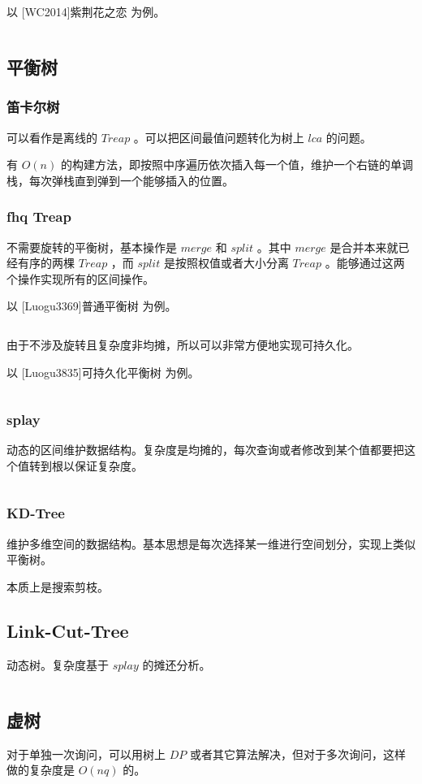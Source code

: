 \documentclass[UTF-8]{ctexart}
\newcommand{\cpp}[1]{\inputminted[bgcolor=bg,breaklines,breakanywhere=true]{c++}{#1}}
\begin{document}
				以 [WC2014]紫荆花之恋 为例。
				\cpp{code//Example/UOJ55.cpp}
		\subsection{平衡树}
			\subsubsection{笛卡尔树}
			可以看作是离线的 $Treap$ 。可以把区间最值问题转化为树上 $lca$ 的问题。
	
			有 $O(n)$ 的构建方法，即按照中序遍历依次插入每一个值，维护一个右链的单调栈，每次弹栈直到弹到一个能够插入的位置。
			\subsubsection{fhq Treap}
			不需要旋转的平衡树，基本操作是 $merge$ 和 $split$ 。其中 $merge$ 是合并本来就已经有序的两棵 $Treap$ ，而 $split$ 是按照权值或者大小分离 $Treap$ 。能够通过这两个操作实现所有的区间操作。
			
			以 [Luogu3369]普通平衡树 为例。
			\cpp{code/Example/Luogu3369.cpp}
	
			由于不涉及旋转且复杂度非均摊，所以可以非常方便地实现可持久化。
			
			以 [Luogu3835]可持久化平衡树 为例。
			\cpp{code/Example/Luogu3835.cpp}
			\subsubsection{splay}
			动态的区间维护数据结构。复杂度是均摊的，每次查询或者修改到某个值都要把这个值转到根以保证复杂度。
			\cpp{code//DataStruct//splay.cpp}
			\subsubsection{KD-Tree}
			维护多维空间的数据结构。基本思想是每次选择某一维进行空间划分，实现上类似平衡树。
	
			本质上是搜索剪枝。
		\subsection{Link-Cut-Tree}
		动态树。复杂度基于 $splay$ 的摊还分析。
		\cpp{code//DataStruct//lct.cpp}
		\subsection{虚树}
		对于单独一次询问，可以用树上 $DP$ 或者其它算法解决，但对于多次询问，这样做的复杂度是 $O(nq)$ 的。
	
\end{document}
